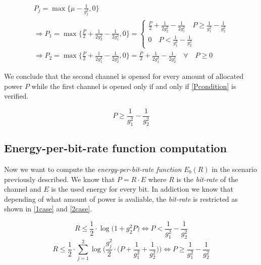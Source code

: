 \begin{equation}
	\begin{gathered}
	 P_j = \max\Big\{\mu - \frac{1}{g_j^2},0\Big\} \\
	 \Rightarrow P_1= \max\Big\{\frac{P}{2} + \frac{1}{2g_2^2} - \frac{1}{2g_1^2},0\Big\} = \begin{cases}
	  \frac{P}{2} + \frac{1}{2g_2^2} - \frac{1}{2g_1^2} \quad P \geq \frac{1}{g_1^2} - \frac{1}{g_2^2} \\
		0 \quad P < \frac{1}{g_1^2} - \frac{1}{g_2^2}
	 \end{cases} \\
	 \Rightarrow P_2= \max\Big\{\frac{P}{2} + \frac{1}{2g_1^2} - \frac{1}{2g_2^2},0\Big\} = \frac{P}{2} + \frac{1}{2g_1^2} - \frac{1}{2g_2^2} \quad \forall \quad P \geq 0
	\end{gathered}
\end{equation}

We conclude that the second channel is opened for every amount of allocated power $P$ while the first channel is opened only if and only if \eqref{Pcondition} is verified.

\begin{equation}
	P \geq \frac{1}{g_1^2} - \frac{1}{g_2^2}
	\label{Pcondition}
\end{equation}

\subsection{Energy-per-bit-rate function computation}

Now we want to compute the \textit{energy-per-bit-rate function} $E_b(R)$ in the scenario previously described. We know that $P = R \cdot E$ where $R$ is the \textit{bit-rate} of the channel and $E$ is the used energy for every bit. In addiction we know that depending of what amount of power is avaliable, the \textit{bit-rate} is restricted as shown in \eqref{1case} and \eqref{2case}.

\begin{equation}
		R \leq \frac{1}{2} \cdot \log\big( 1 + g_2^2P \big) \Leftrightarrow P < \frac{1}{g_1^2} - \frac{1}{g_2^2}
		\label{1case}
\end{equation}
\begin{equation}
		R \leq \frac{1}{2} \cdot \sum_{j=1}^2 \log\Big(\frac{g_j^2}{2} \cdot \Big(P+\frac{1}{g_1^2} + \frac{1}{g_2^2}\Big)\Big) \Leftrightarrow P \geq \frac{1}{g_1^2} - \frac{1}{g_2^2}
		\label{2case}
\end{equation}

